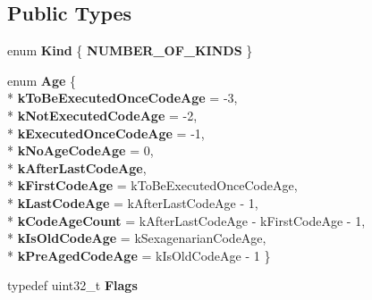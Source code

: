 \subsection*{Public Types}
\begin{DoxyCompactItemize}
\item 
enum {\bfseries Kind} \{ {\bfseries N\+U\+M\+B\+E\+R\+\_\+\+O\+F\+\_\+\+K\+I\+N\+DS}
 \}\hypertarget{classv8_1_1internal_1_1_code_aabd99abf83167f429b6ad4f0b761466e}{}\label{classv8_1_1internal_1_1_code_aabd99abf83167f429b6ad4f0b761466e}

\item 
enum {\bfseries Age} \{ \\*
{\bfseries k\+To\+Be\+Executed\+Once\+Code\+Age} = -\/3, 
\\*
{\bfseries k\+Not\+Executed\+Code\+Age} = -\/2, 
\\*
{\bfseries k\+Executed\+Once\+Code\+Age} = -\/1, 
\\*
{\bfseries k\+No\+Age\+Code\+Age} = 0, 
\\*
{\bfseries k\+After\+Last\+Code\+Age}, 
\\*
{\bfseries k\+First\+Code\+Age} = k\+To\+Be\+Executed\+Once\+Code\+Age, 
\\*
{\bfseries k\+Last\+Code\+Age} = k\+After\+Last\+Code\+Age -\/ 1, 
\\*
{\bfseries k\+Code\+Age\+Count} = k\+After\+Last\+Code\+Age -\/ k\+First\+Code\+Age -\/ 1, 
\\*
{\bfseries k\+Is\+Old\+Code\+Age} = k\+Sexagenarian\+Code\+Age, 
\\*
{\bfseries k\+Pre\+Aged\+Code\+Age} = k\+Is\+Old\+Code\+Age -\/ 1
 \}\hypertarget{classv8_1_1internal_1_1_code_aedb41249ceba49f469a868063c9cd822}{}\label{classv8_1_1internal_1_1_code_aedb41249ceba49f469a868063c9cd822}

\item 
typedef uint32\+\_\+t {\bfseries Flags}\hypertarget{classv8_1_1internal_1_1_code_ada0a3caecc8e7743a43e919dc3f80bfa}{}\label{classv8_1_1internal_1_1_code_ada0a3caecc8e7743a43e919dc3f80bfa}

\end{DoxyCompactItemize}
